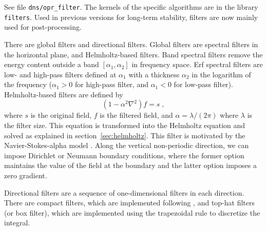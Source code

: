 See file {\tt dns/opr\_filter}. The kernels of the specific algorithms are in the library {\tt filters}. Used in previous versions for long-term stability, filters are now mainly used for post-processing.

There are global filters and directional filters. Global filters are spectral filters in the horizontal plane, and Helmholtz-based filters. Band spectral filters remove the energy content outside a band $[\alpha_1,\alpha_2]$ in frequency space. Erf spectral filters are low- and high-pass filters defined at $\alpha_1$ with a thickness $\alpha_2$ in the logarithm of the frequency ($\alpha_1>0$ for high-pass filter, and $\alpha_1<0$ for low-pass filter). Helmholtz-based filters are defined by
\begin{equation}
  (1-\alpha^2\nabla^2) f = s \;,
\end{equation}
where $s$ is the original field, $f$ is the filtered field, and $\alpha=\lambda/(2\pi)$ where $\lambda$ is the filter size. This equation is transformed into the Helmholtz equation and solved as explained in section~\ref{sec:helmholtz}. This filter is motivated by the Navier-Stokes-alpha model \citep{Foias:2001}. Along the vertical non-periodic direction, we can impose Dirichlet or Neumann boundary conditions, where the former option maintains the value of the field at the boundary and the latter option imposes a zero gradient.

Directional filters are a sequence of one-dimensional filters in each direction. There are compact filters, which are implemented following \cite{Lele:1992}, and top-hat filters (or box filter), which are implemented using the trapezoidal rule to discretize the integral.

